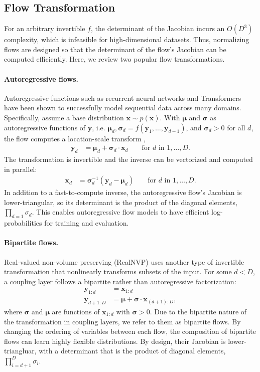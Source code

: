 \documentclass{article}
\newcommand{\mathbold}[1]{\ensuremath{\boldsymbol{\mathbf{#1}}}}
\newcommand{\nestedmathbold}[1]{{\mathbold{#1}}}
\newcommand{\mbx}{\nestedmathbold{x}}
\newcommand{\mby}{\nestedmathbold{y}}
\newcommand{\mbmu}{\nestedmathbold{\mu}}
\newcommand{\mbsigma}{\nestedmathbold{\sigma}}
\begin{document}
\subsection{Flow Transformation}

For an arbitrary invertible $f$, the determinant of the Jacobian incurs an $O(D^3)$ complexity, which is infeasible for high-dimensional datasets. Thus, normalizing flows are designed so that the determinant of the flow's Jacobian can be computed efficiently. Here, we review two popular flow transformations.

\paragraph{Autoregressive flows.}
Autoregressive functions such as recurrent neural networks and Transformers \citep{vaswani2017attention} have been shown to successfully model sequential data across many domains.
Specifically, assume a base distribution $\mbx\sim p(\mbx)$. With $\mbmu$ and $\mbsigma$ as autoregressive functions of $\mby$, i.e. $\mbmu_{d}, \mbsigma_d = f(\mby_{1}, \dots, \mby_{d-1})$, and $\mbsigma_d > 0$ for all $d$, the flow computes a location-scale transform \citep{papamakarios2017masked, kingma2016improving},
\begin{align*}
\mby_d &= \mbmu_d + \mbsigma_d \cdot \mbx_{d} && \text{ for } d \text{ in } 1, \dots, D.
\end{align*}
The transformation is invertible and the inverse can be vectorized and computed in parallel:
\begin{align*}
\mbx_d &= \mbsigma_d^{-1}( \mby_{d} - \mbmu_d ) && \text{ for } d \text{ in } 1, \dots, D.
\end{align*}
In addition to a fast-to-compute inverse, the autoregressive flow's Jacobian is lower-triangular, so its determinant is the product of the diagonal elements, $\prod_{d=1} \sigma_{d}$.
This enables autoregressive flow models to have efficient log-probabilities for training and evaluation.


\paragraph{Bipartite flows.}
Real-valued non-volume preserving (RealNVP) uses another type of invertible transformation \citep{dinh2017density} that nonlinearly transforms subsets of the input. For some $d < D$, a coupling layer follows a bipartite rather than autoregressive factorization:
\begin{align}\label{eq:realnvp}
    \mby_{1:d} &= \mbx_{1:d} \\
    \mby_{d+1:D} &= \mbmu + \mbsigma \cdot \mbx_{(d+1):D},
\end{align}
where $\mbsigma$ and $\mbmu$ are functions of $\mbx_{1:d}$ with $\mbsigma>0$. Due to the bipartite nature of the transformation in coupling layers, we refer to them as bipartite flows. By changing the ordering of variables between each flow, the composition of bipartite flows can learn highly flexible distributions. By design, their Jacobian is lower-triangluar, with a determinant that is the product of diagonal elements, $\prod_{i=d+1}^D \sigma_{i}$.
\end{document}
